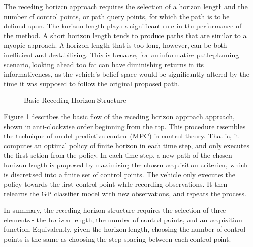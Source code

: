 			The receding horizon approach requires the selection of a horizon length and the number of control points, or path query points, for which the path is to be defined upon. The horizon length plays a significant role in the performance of the method. A short horizon length tends to produce paths that are similar to a myopic approach. A horizon length that is too long, however, can be both inefficient and destabilising. This is because, for an informative path-planning scenario, looking ahead too far can have diminishing returns in its informativeness, as the vehicle's belief space would be significantly altered by the time it was supposed to follow the original proposed path.
	
			\begin{figure}
				\begin{center}
				\end{center}
			\caption{Basic Receding Horizon Structure}
			\label{Figure:RecedingHorizonMethodOutline}
			\end{figure}
					
			Figure \ref{Figure:RecedingHorizonMethodOutline} describes the basic flow of the receding horizon approach approach, shown in anti-clockwise order beginning from the top. This procedure resembles the technique of model predictive control (MPC) in control theory. That is, it computes an optimal policy of finite horizon in each time step, and only executes the first action from the policy. In each time step, a new path of the chosen horizon length is proposed by maximising the chosen acquisition criterion, which is discretised into a finite set of control points. The vehicle only executes the policy towards the first control point while recording observations. It then relearns the GP classifier model with new observations, and repeats the process.
	
			In summary, the receding horizon structure requires the selection of three elements - the horizon length, the number of control points, and an acquisition function. Equivalently, given the horizon length, choosing the number of control points is the same as choosing the step spacing between each control point. 
			
